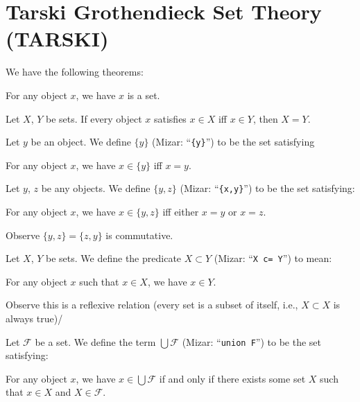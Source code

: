 \section{Tarski Grothendieck Set Theory (TARSKI)}

We have the following theorems:

\begin{thm}
\item For any object $x$, we have $x$ is a set.
\item Let $X$, $Y$ be sets. If every object $x$ satisfies $x\in X$ iff
  $x\in Y$, then $X=Y$. 
\end{thm}

\begin{definition}
Let $y$ be an object. We define $\{y\}$ (Mizar: ``\verb#{y}#'') to be the set satisfying
\begin{defn}
\item For any object $x$, we have $x\in\{y\}$ iff $x=y$.
\end{defn}
Let $y$, $z$ be any objects. We define $\{y,z\}$ (Mizar: ``\verb#{x,y}#'') to be the set satisfying:
\begin{defn}
\item For any object $x$, we have $x\in\{y,z\}$ iff either $x=y$ or $x=z$.
\end{defn}
Observe $\{y,z\}=\{z,y\}$ is commutative.
\end{definition}

\begin{definition}
Let $X$, $Y$ be sets. We define the predicate $X\subset Y$ (Mizar:
``\verb#X c= Y#'') to mean:
\begin{defn}
\item For any object $x$ such that $x\in X$, we have $x\in Y$.
\end{defn}
Observe this is a reflexive relation (every set is a subset of itself,
i.e., $X\subset X$ is always true)/
\end{definition}

\begin{definition}
Let $\mathcal{F}$ be a set. We define the term $\bigcup\mathcal{F}$
(Mizar: ``\verb#union F#'') to
be the set satisfying:
\begin{defn}
\item For any object $x$, we have $x\in\bigcup\mathcal{F}$ if and only
  if there exists some set $X$ such that $x\in X$ and $X\in\mathcal{F}$.
\end{defn}
\end{definition}

